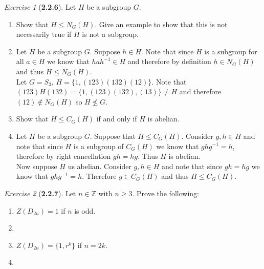 \documentclass[12pt]{amsart}
\makeatletter
\theoremstyle{remark}
\newtheorem*{exercise}{Exercise}%
\def\ZZ{\ensuremath{\mathbb Z}}
\renewenvironment{proof}[1][\proofname]{\par\doublespacing
  \pushQED{\qed}%
  \normalfont \topsep6\p@\@plus6\p@\relax
  \list{}{%
    \settowidth{\leftmargin}{\itshape\proofname:\hskip\labelsep}%
    \setlength{\labelwidth}{0pt}%
    \setlength{\itemindent}{-\leftmargin}%
  }%
  \item[\hskip\labelsep\itshape#1\@addpunct{:}]\ignorespaces
}{%
  \popQED\endlist\@endpefalse
  \singlespacing
}
\theoremstyle{mycomment}
\makeatother
\begin{document}
\begin{exercise}[\textbf{2.2.6}] Let $H$ be a subgroup $G$. 
  \begin{enumerate}
    \item[a] Show that $H \leq N_G(H)$. Give an example to show that this is not necessarily true if $H$ is not a subgroup.\\
    \begin{proof} Let $H$ be a subgroup $G$. Suppose $h \in H$. Note that since $H$ is a subgroup 
      for all $a \in H$ we know that $hah^{-1} \in H$ and therefore by definition $h \in N_G(H)$ and thus $H \leq N_G(H)$.\\

      Let $G = S_3$, $H = \{1, (1 2 3) (1 3 2) (1 2)\}$. Note that $(1 2 3 )H(1 3 2) = \{1, (1 2 3) (1 3 2), (1 3)\} \neq H$ and therefore 
      $(1 2) \not\in N_G(H)$ so $H \not\leq G$.
    \end{proof} 

    \item[b] Show that $H \leq C_G(H)$ if and only if $H$ is abelian.\\
    \begin{proof} Let $H$ be a subgroup $G$. Suppose that $H \leq C_G(H)$. Consider $g, h\in H$ and note that since $H$ is a subgroup of $C_G(H)$ we 
      know that $ghg^{-1} = h$, therefore by right cancellation $gh = hg$. Thus $H$ is abelian.\\
      Now suppose $H$ us abelian. Consider $g, h \in H$ and note that since $gh = hg$ we know that $ghg^{-1} = h$. Therefore $g \in C_G(H)$ and thus $H \leq C_G(H)$.
    \end{proof} 
  \end{enumerate}
\end{exercise}
\vspace{.15in}




\begin{exercise}[\textbf{2.2.7}] Let $n \in \ZZ$ with $n \geq 3$. Prove the following:
  \begin{enumerate}
    \item[a]$Z(D_{2n}) = 1$ if $n$ is odd. 
    \begin{proof}
    \end{proof}

    \item[b]$Z(D_{2n}) = \{1, r^k\}$ if $n = 2k$.
    \begin{proof}
    \end{proof}
  \end{enumerate}
\end{exercise}
\vspace{.15in}
\end{document}
